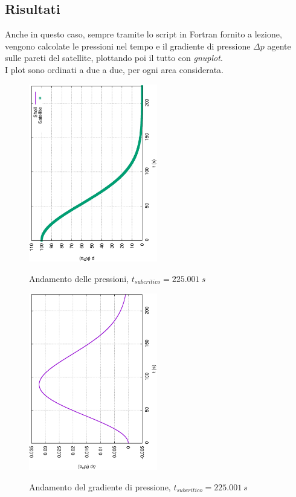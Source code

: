 \documentclass{article}
\begin{document}
        \subsection{Risultati\label{Esercizio2_risultati}}
        Anche in questo caso, sempre tramite lo script in Fortran fornito a lezione, 
        vengono calcolate le pressioni nel tempo e il gradiente di pressione $\Delta p$ agente sulle pareti
        del satellite, plottando poi il tutto con \textit{gnuplot}.\\ 
        I plot sono ordinati a due a due, per ogni area considerata.
        
        \begin{figure}[h!]
            \centering
            \includegraphics[width=0.5\textwidth, angle=-90]{MUL2/Esercitazione1/2A/p.eps}
            \label{fig:press_10_5}
            \caption{Andamento delle pressioni, $t_{subcritico} = 225.001  \ s$} 
        \end{figure}

        \begin{figure}[h!]
            \centering
            \includegraphics[width=0.5\textwidth, angle=-90]{MUL2/Esercitazione1/2A/Dp.eps}
            \label{fig:grad_press_10_5}
            \caption{Andamento del gradiente di pressione, $t_{subcritico} = 225.001  \ s$}
        \end{figure}
\end{document}
